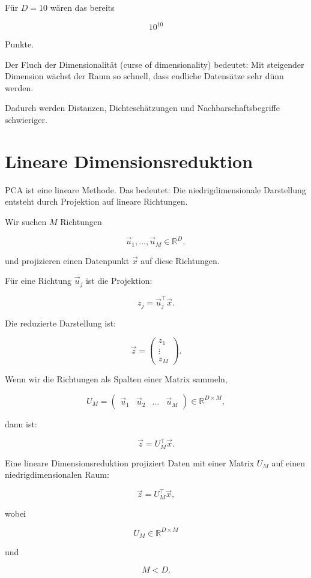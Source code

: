 Für \(D=10\) wären das bereits

\[
    10^{10}
\]

Punkte.

\begin{conceptbox}
Der Fluch der Dimensionalität (curse of dimensionality) bedeutet:
Mit steigender Dimension wächst der Raum so schnell, dass endliche Datensätze sehr dünn werden.

Dadurch werden Distanzen, Dichteschätzungen und Nachbarschaftsbegriffe schwieriger.
\end{conceptbox}

\section{Lineare Dimensionsreduktion}

PCA ist eine lineare Methode.
Das bedeutet:
Die niedrigdimensionale Darstellung entsteht durch Projektion auf lineare Richtungen.

Wir suchen \(M\) Richtungen

\[
    \vec{u}_1,\dots,\vec{u}_M
    \in
    \mathbb{R}^D,
\]

und projizieren einen Datenpunkt \(\vec{x}\) auf diese Richtungen.

Für eine Richtung \(\vec{u}_j\) ist die Projektion:

\[
    z_j
    =
    \vec{u}_j^{\top}\vec{x}.
\]

Die reduzierte Darstellung ist:

\[
    \vec{z}
    =
    \begin{pmatrix}
        z_1 \\
        \vdots \\
        z_M
    \end{pmatrix}.
\]

Wenn wir die Richtungen als Spalten einer Matrix sammeln,

\[
    U_M
    =
    \begin{pmatrix}
        \vec{u}_1 & \vec{u}_2 & \dots & \vec{u}_M
    \end{pmatrix}
    \in
    \mathbb{R}^{D\times M},
\]

dann ist:

\[
    \vec{z}
    =
    U_M^{\top}\vec{x}.
\]

\begin{definitionbox}
Eine lineare Dimensionsreduktion projiziert Daten mit einer Matrix \(U_M\) auf einen niedrigdimensionalen Raum:

\[
    \vec{z}
    =
    U_M^{\top}\vec{x},
\]

wobei

\[
    U_M\in\mathbb{R}^{D\times M}
\]

und

\[
    M<D.
\]
\end{definitionbox}

